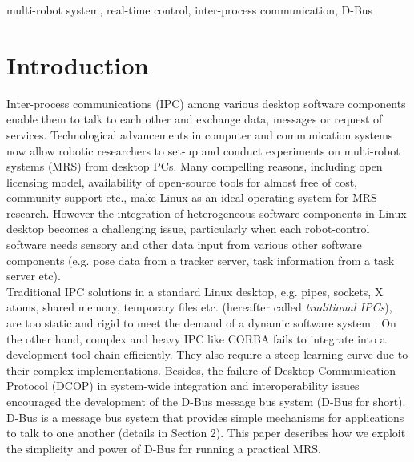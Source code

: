 \documentclass{ifacconf}
\begin{document}
\begin{frontmatter}
\begin{keyword}
multi-robot system, real-time control, inter-process communication, D-Bus
\end{keyword}

\end{frontmatter}
\section{Introduction}
Inter-process communications (IPC) among various desktop software components enable them to talk to each other and exchange data, messages or request of services. Technological advancements in computer and communication systems now allow robotic researchers to set-up and conduct experiments on multi-robot systems (MRS) from desktop PCs. Many compelling reasons, including open licensing model, availability of open-source tools for almost free of cost, community support etc., make Linux as an ideal operating system for MRS research. However the integration of heterogeneous software components in Linux desktop becomes a challenging issue, particularly when each robot-control software needs sensory and other data input from various other software components (e.g. pose data from a tracker server, task information from a task server etc).\\ 
Traditional IPC solutions in a standard Linux desktop, e.g. pipes, sockets, X atoms, shared memory, temporary files etc. (hereafter called {\em traditional IPCs}), are too static and rigid to meet the demand of a dynamic software system \cite{Wittenburg2005}. On the other hand, complex and heavy IPC like CORBA fails to integrate into a development tool-chain efficiently. They also require a steep learning curve due to their complex implementations. Besides, the failure of Desktop Communication Protocol (DCOP) in system-wide integration and interoperability issues encouraged the development of the D-Bus message bus system (D-Bus for short). D-Bus is a message bus system that provides simple mechanisms for applications to talk to one another (details in Section 2). This paper describes  how we exploit the simplicity and power of D-Bus  for running a practical MRS.\\
\end{document}
